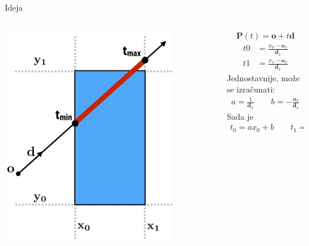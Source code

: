 \documentclass[9pt]{beamer}
\begin{document}
\begin{frame}{Ideja}
	\begin{columns}
		\begin{column}{0.5\textwidth}
				\begin{center}
				\includegraphics[width=0.8\textwidth]{slike/slide_006.jpg}
			\end{center}
		\end{column}
	\begin{column}{0.5\textwidth}
		\begin{align*}
		\mathbf{P}(t) = \mathbf{o} + t\mathbf{d}
		\end{align*}
		\begin{align*}
		t0 &= \frac{x_0 - \mathbf{o}_x}{\mathbf{d}_x} \\
		t1 &= \frac{x_1 - \mathbf{o}_x}{\mathbf{d}_x}
		\end{align*}
		Jednostavnije, može se izračunati:
		\begin{align*}
		a = \frac{1}{\mathbf{d}_x} \qquad b = -\frac{\mathbf{o}_x}{\mathbf{d}_x}
		\end{align*}
		Sada je
		\begin{align*}
		t_0 = a x_0 + b \qquad t_1 = a x_1 + b
		\end{align*}
	\end{column}
	\end{columns}
\end{frame}
\end{document}
